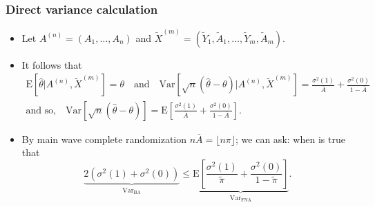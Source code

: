 \documentclass[aspectratio=169, 10pt]{beamer}
\theoremstyle{definition}
\theoremstyle{plain}
\def\E{\mathrm{E}}
\def\Var{\mathrm{Var}}
\def\FNA{\mathrm{FNA}}
\def\BA{\mathrm{BA}}
\begin{document}
\begin{frame}
\frametitle{Direct variance calculation}
\begin{itemize}
  \item Let \(A^{(n)} = (A_{1}, \dots, A_{n})\) and \(\tilde{X}^{(m)} =
    (\tilde{Y}_{1}, \tilde{A}_{1}, \dots, \tilde{Y}_{m}, \tilde{A}_{m})\).
    \vfill
  \item It follows that
    \begin{equation*}
      \begin{gathered}
        \E [\hat{\theta} | A^{(n)}, \tilde{X}^{(m)}] = \theta \quad \text{and}
        \quad
        \Var [\sqrt{n} (\hat{\theta} - \theta) | A^{(n)}, \tilde{X}^{(m)}] =
        \frac{\sigma^{2} (1)}{\overline{A}} + \frac{\sigma^{2} (0)}{1 -
        \overline{A}} \\
        \text{and so,} \quad
        \Var [\sqrt{n} (\hat{\theta} - \theta)] =
        \E \left[ \frac{\sigma^{2} (1)}{\overline{A}} + \frac{\sigma^{2} (0)}{1
        - \overline{A}} \right].
      \end{gathered}
    \end{equation*}
    \vfill
  \item By main wave complete randomization \(n \overline{A} = \lfloor n \pi
    \rfloor\); we can ask: when is true that
    \begin{equation*}
      \underbrace{2 \left( \sigma^{2} (1) + \sigma^{2} (0)
      \right)}_{\Var_{\BA}} \leq \underbrace{\E \left[
      \frac{\sigma^{2} (1)}{\tilde{\pi}} + \frac{\sigma^{2} (0)}{1 -
      \tilde{\pi}} \right]}_{\Var_{\FNA}}.
    \end{equation*}
\end{itemize}
\end{frame}
\end{document}
